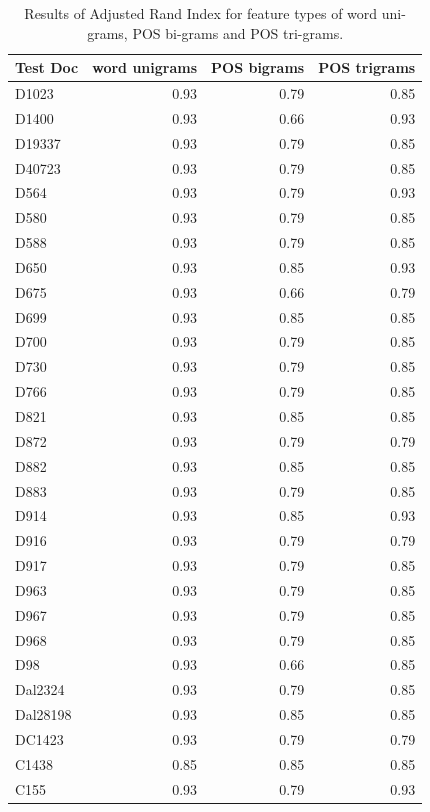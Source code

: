 \documentclass[a4paper,10pt,twoside,fleqn]{article}
\begin{document}
\begin{table}
\small 

\caption{Results of Adjusted Rand Index for feature types of word uni-grams, POS bi-grams and POS tri-grams.}
\label{tab:results-clust}
 \begin{tabular}{lrrr} \toprule
Test Doc       & word unigrams & POS bigrams & POS trigrams\\ \midrule
D1023     & 0.93  & 0.79  & 0.85 \\
D1400     & 0.93  & 0.66  & 0.93 \\
D19337    & 0.93  & 0.79  & 0.85 \\
D40723    & 0.93  & 0.79  & 0.85 \\
D564      & 0.93  & 0.79  & 0.93 \\
D580      & 0.93  & 0.79  & 0.85 \\
D588      & 0.93  & 0.79  & 0.85 \\
D650      & 0.93  & 0.85  & 0.93 \\
D675      & 0.93  & 0.66  & 0.79 \\
D699      & 0.93  & 0.85  & 0.85 \\
D700      & 0.93  & 0.79  & 0.85 \\
D730      & 0.93  & 0.79  & 0.85 \\
D766      & 0.93  & 0.79  & 0.85 \\
D821      & 0.93  & 0.85  & 0.85 \\
D872      & 0.93  & 0.79  & 0.79 \\
D882      & 0.93  & 0.85  & 0.85 \\
D883      & 0.93  & 0.79  & 0.85 \\
D914      & 0.93  & 0.85  & 0.93 \\
D916      & 0.93  & 0.79  & 0.79 \\
D917      & 0.93  & 0.79  & 0.85 \\
D963      & 0.93  & 0.79  & 0.85 \\
D967      & 0.93  & 0.79  & 0.85 \\
D968      & 0.93  & 0.79  & 0.85 \\
D98       & 0.93  & 0.66  & 0.85 \\
Dal2324   & 0.93  & 0.79  & 0.85 \\
Dal28198  & 0.93  & 0.85  & 0.85 \\
DC1423    & 0.93  & 0.79  & 0.79 \\
C1438     & 0.85  & 0.85  & 0.85 \\
C155      & 0.93  & 0.79  & 0.93 \\

\end{tabular}
\end{table}
\end{document}
